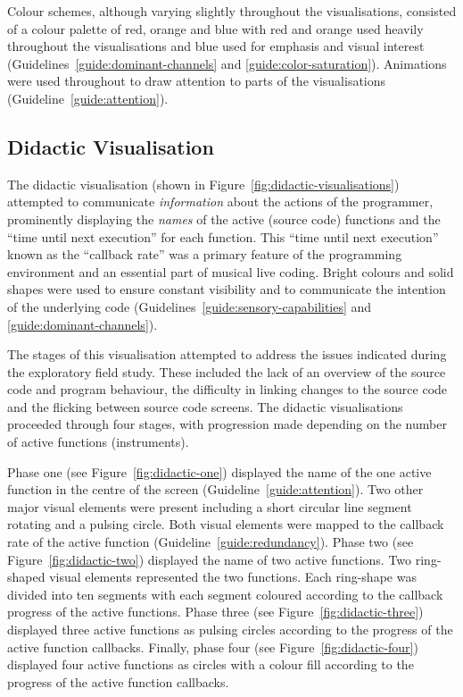 Colour schemes, although varying slightly throughout the visualisations, consisted of a colour palette of red, orange and blue with red and orange used heavily throughout the visualisations and blue used for emphasis and visual interest (Guidelines~\ref{guide:dominant-channels} and \ref{guide:color-saturation}). Animations were used throughout to draw attention to parts of the visualisations (Guideline~\ref{guide:attention}).

\subsection{Didactic Visualisation}
\label{sec:didactic-visualisation}



The didactic visualisation (shown in Figure~\ref{fig:didactic-visualisations}) attempted to communicate \emph{information} about the actions of the programmer, prominently displaying the \emph{names} of the active (source code) functions and the ``time until next execution'' for each function. This ``time until next execution'' known as the ``callback rate'' was a primary feature of the programming environment and an essential part of musical live coding. Bright colours and solid shapes were used to ensure constant visibility and to communicate the intention of the underlying code (Guidelines~\ref{guide:sensory-capabilities} and \ref{guide:dominant-channels}). 

The stages of this visualisation attempted to address the issues indicated during the exploratory field study. These included the lack of an overview of the source code and program behaviour, the difficulty in linking changes to the source code and the flicking between source code screens. The didactic visualisations proceeded through four stages, with progression made depending on the number of active functions (instruments).

Phase one (see Figure~\ref{fig:didactic-one}) displayed the name of the one active function in the centre of the screen (Guideline~\ref{guide:attention}). Two other major visual elements were present including a short circular line segment rotating and a pulsing circle. Both visual elements were mapped to the callback rate of the active function (Guideline~\ref{guide:redundancy}). Phase two (see Figure~\ref{fig:didactic-two}) displayed the name of two active functions. Two ring-shaped visual elements represented the two functions. Each ring-shape was divided into ten segments with each segment coloured according to the callback progress of the active functions. Phase three (see Figure~\ref{fig:didactic-three}) displayed three active functions as pulsing circles according to the progress of the active function callbacks. Finally, phase four (see Figure~\ref{fig:didactic-four}) displayed four active functions as circles with a colour fill according to the progress of the active function callbacks.

